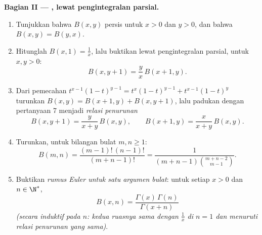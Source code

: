 \begin{problem}
\medskip
\noindent\textbf{Bagian II --- , lewat pengintegralan parsial.}
\begin{enumerate}[resume]
  \item Tunjukkan bahwa $B(x,y)$  persis untuk $x > 0$ dan $y
        > 0$, dan bahwa $B(x,y) = B(y,x)$.
  \item Hitunglah $B(x, 1) = \frac1x$, lalu buktikan lewat
        pengintegralan parsial, untuk $x, y > 0$:
        \[
        B(x, y+1) = \frac{y}{x}\,B(x+1, y) .
        \]
  \item Dari pemecahan $t^{x-1}(1-t)^{y-1} =
        t^{x}(1-t)^{y-1} + t^{x-1}(1-t)^{y}$ turunkan $B(x,y) =
        B(x+1,y) + B(x,y+1)$, lalu padukan dengan pertanyaan 7 menjadi
        \emph{relasi penurunan}
        \[
        B(x, y+1) = \frac{y}{x+y}\,B(x,y),
        \qquad
        B(x+1, y) = \frac{x}{x+y}\,B(x,y) .
        \]
  \item Turunkan, untuk bilangan bulat $m, n \geq 1$:
        \[
        B(m, n) = \frac{(m-1)!\,(n-1)!}{(m+n-1)!}
        = \frac{1}{(m+n-1)\binom{m+n-2}{m-1}} .
        \]
  \item Buktikan \emph{rumus Euler untuk satu argumen bulat}:
        untuk setiap $x > 0$ dan $n \in \N^*$,
        \[
        B(x, n) = \frac{\Gamma(x)\,\Gamma(n)}{\Gamma(x + n)}
        \]
        \emph{(secara induktif pada $n$: kedua ruasnya sama dengan
        $\frac1x$ di $n = 1$ dan menuruti relasi penurunan yang sama)}.
\end{enumerate}


\end{problem}
